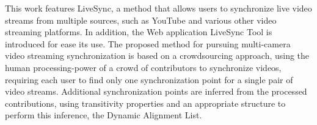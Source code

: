 This work features LiveSync, a method that allows users to synchronize live video streams from multiple sources, such as YouTube and various other video streaming platforms. In addition, the Web application LiveSync Tool is introduced for ease its use. The proposed method for pursuing multi-camera video streaming synchronization is based on a crowdsourcing approach, using the human processing-power of a crowd of contributors to synchronize videos, requiring each user to find only one synchronization point for a single pair of video streams. Additional synchronization points are inferred from the processed contributions, using transitivity properties and an appropriate structure to perform this inference, the Dynamic Alignment List.
